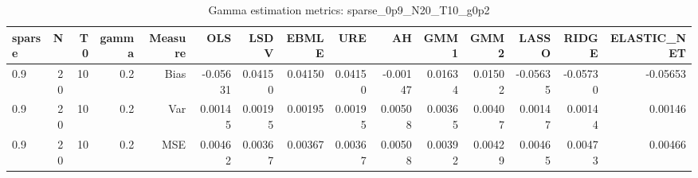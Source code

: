 \begin{table}[!htbp]\centering
\caption{Gamma estimation metrics: sparse_0p9_N20_T10_g0p2}
\label{tab:table1_sparse_0p9_N20_T10_g0p2}
\begin{tabular}{lrrrrrrrrrrrrrr}
\hline
sparse & N & T0 & gamma & Measure & OLS & LSDV & EBMLE & URE & AH & GMM1 & GMM2 & LASSO & RIDGE & ELASTIC_NET \\
\hline
0.9 & 20 & 10 & 0.2 & Bias & -0.05631 & 0.04150 & 0.04150 & 0.04150 & -0.00147 & 0.01634 & 0.01502 & -0.05635 & -0.05730 & -0.05653 \\
0.9 & 20 & 10 & 0.2 & Var & 0.00145 & 0.00195 & 0.00195 & 0.00195 & 0.00508 & 0.00365 & 0.00407 & 0.00147 & 0.00144 & 0.00146 \\
0.9 & 20 & 10 & 0.2 & MSE & 0.00462 & 0.00367 & 0.00367 & 0.00367 & 0.00508 & 0.00392 & 0.00429 & 0.00465 & 0.00473 & 0.00466 \\
\hline
\end{tabular}
\end{table}

